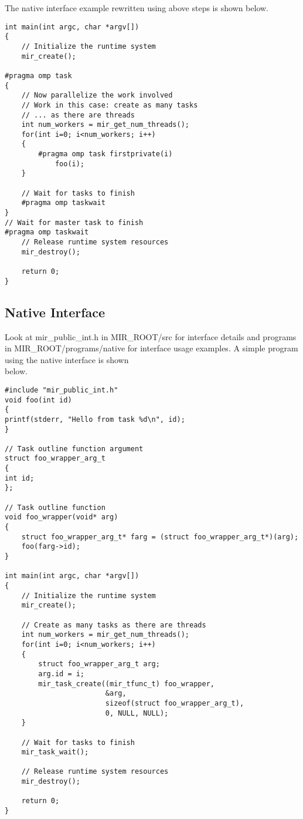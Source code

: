 \documentclass[11pt,a4paper]{article}
\begin{document}
The native interface example rewritten using above steps is shown below.

\begin{lstlisting}[style=MyCStyle]
int main(int argc, char *argv[])
{
    // Initialize the runtime system
    mir_create();

#pragma omp task
{
    // Now parallelize the work involved
    // Work in this case: create as many tasks 
    // ... as there are threads
    int num_workers = mir_get_num_threads();
    for(int i=0; i<num_workers; i++)
    {
        #pragma omp task firstprivate(i)
            foo(i);
    }
        
    // Wait for tasks to finish
    #pragma omp taskwait
}
// Wait for master task to finish
#pragma omp taskwait
    // Release runtime system resources
    mir_destroy();

    return 0;
}
\end{lstlisting}

\subsection{Native Interface}\label{native-interface}

Look at mir\_public\_int.h in MIR\_ROOT/src for interface details and programs in MIR\_ROOT/programs/native for interface usage examples. A simple program using the native interface is shown\\below.  

\begin{lstlisting}[style=MyCStyle]
#include "mir_public_int.h"
void foo(int id)
{
printf(stderr, "Hello from task %d\n", id);
}

// Task outline function argument
struct foo_wrapper_arg_t
{
int id;
};

// Task outline function
void foo_wrapper(void* arg)
{
    struct foo_wrapper_arg_t* farg = (struct foo_wrapper_arg_t*)(arg);
    foo(farg->id);
}

int main(int argc, char *argv[])
{
    // Initialize the runtime system
    mir_create();

    // Create as many tasks as there are threads
    int num_workers = mir_get_num_threads();
    for(int i=0; i<num_workers; i++)
    {
        struct foo_wrapper_arg_t arg;
        arg.id = i;
        mir_task_create((mir_tfunc_t) foo_wrapper, 
                        &arg, 
                        sizeof(struct foo_wrapper_arg_t), 
                        0, NULL, NULL);
    }
        
    // Wait for tasks to finish
    mir_task_wait();

    // Release runtime system resources
    mir_destroy();

    return 0;
}
\end{lstlisting}
\end{document}
